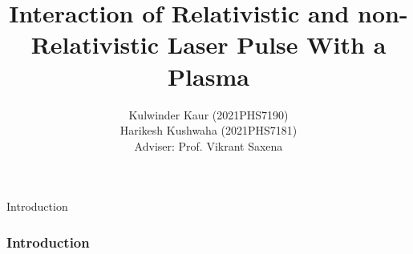 \documentclass{beamer}
\title{Interaction of Relativistic and non-Relativistic Laser Pulse With a Plasma}
\date{}
\institute[IITD]{\large Indian Institute of Technology, Delhi}
\author[me]{Kulwinder Kaur (2021PHS7190)\\ Harikesh Kushwaha (2021PHS7181)\\[3mm]Adviser: Prof. Vikrant Saxena}
\begin{document}
\maketitle
\begin{frame}{Introduction}
    \frametitle{Introduction}
\end{frame}
\end{document}
